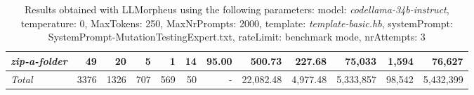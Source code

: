 \begin{table*}
{\begin{tabular}{l||r|r|r|r|r|r||r|r||r|r|r}
   \hline
   \textit{zip-a-folder} & 49 & 20 & 5 & 1 & 14 & 95.00 & 500.73 & 227.68 & 75,033 & 1,594 & 76,627 \\ 
   \hline
   \textit{Total} & 3376 & 1326 & 707 & 569 & 50 & - & 22,082.48  & 4,977.48 & 5,333,857 & 98,542 & 5,432,399 \\ 
 \end{tabular}
 }
 \caption{Results obtained with LLMorpheus using the following parameters: 
   model: \textit{codellama-34b-instruct}, 
   temperature: 0, 
   MaxTokens: 250, 
   MaxNrPrompts: 2000, 
   template: \textit{template-basic.hb}, 
   systemPrompt: SystemPrompt-MutationTestingExpert.txt, 
   rateLimit: benchmark mode, 
   nrAttempts: 3  
 }
\end{table*}


